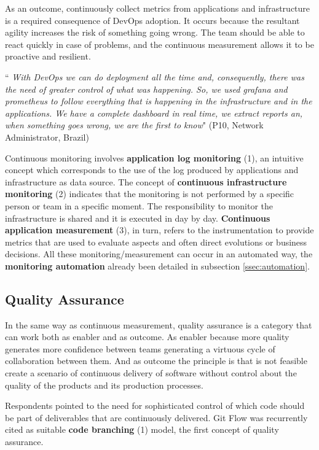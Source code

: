 As an outcome, continuously collect metrics from applications and
infrastructure is a required consequence of DevOps adoption. It occurs because
the resultant agility increases the risk of something going wrong. The team
should be able to react quickly in case of problems, and the continuous
measurement allows it to be proactive and resilient.

\begin{mq}
``\emph{
With DevOps we can do deployment all the time and, consequently, there was
the need of greater control of what was happening. So, we used grafana and
prometheus to follow everything that is happening in the infrastructure and in
the applications. We have a complete dashboard in real time, we extract reports
an, when something goes wrong, we are the first to know}" (P10, Network
Administrator, Brazil)
\end{mq}

Continuous monitoring involves \textbf{application log monitoring} (1), an
intuitive concept which corresponds to the use of the log produced by
applications and infrastructure as data source. The concept of
\textbf{continuous infrastructure monitoring} (2) indicates that the monitoring
is not performed by a specific person or team in a specific moment. The
responsibility to monitor the infrastructure is shared and it is executed in
day by day. \textbf{Continuous application measurement} (3), in turn, refers to
the instrumentation to provide metrics that are used to evaluate aspects and
often direct evolutions or business decisions. All these monitoring/measurement
can occur in an automated way, the \textbf{monitoring automation} already been
detailed in subsection \ref{ssec:automation}.

\subsection{Quality Assurance}

In the same way as continuous measurement, quality assurance is a category that
can work both as enabler and as outcome. As enabler because more quality
generates more confidence between teams generating a virtuous cycle of
collaboration between them. And as outcome the principle is that is not
feasible create a scenario of continuous delivery of software without control
about the quality of the products and its production processes.

Respondents pointed to the need for sophisticated control of which code should
be part of deliverables that are continuously delivered. Git Flow was
recurrently cited as suitable \textbf{code branching} (1) model, the first
concept of quality assurance.


